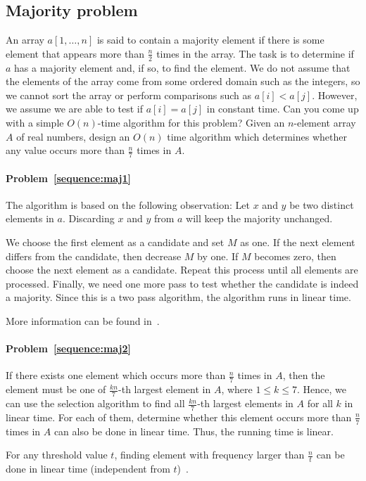 \subsection{Majority problem}
\begin{Exercise}
\Question An array $a[1, \dots, n]$ is said to contain a majority element if there is some element that appears more than $\frac{n}{2}$ times in the array. The task is to determine if $a$ has a majority element and, if so, to find the element. We do not assume that the elements of the array come from some ordered domain such as the integers, so we cannot sort the array or perform comparisons such as $a[i] < a[j]$. However, we assume we are able to test if $a[i] = a[j]$ in constant time. Can you come up with a simple $O(n)$-time algorithm for this problem? \label{sequence:maj1} 
\Question Given an $n$-element array $A$ of real numbers, design an $O(n)$ time algorithm which determines whether any value occurs more than $\frac{n}{7}$ times in $A$. \label{sequence:maj2}
\end{Exercise}

\begin{Answer}
\paragraph{Problem~\ref{sequence:maj1}}
The algorithm is based on the following observation: Let $x$ and $y$ be two distinct elements in $a$. Discarding $x$ and $y$ from $a$ will keep the majority unchanged. 

We choose the first element as a candidate and set $M$ as one. If the next element differs from the candidate, then decrease $M$ by one. If $M$ becomes zero, then choose the next element as a candidate. Repeat this process until all elements are processed. Finally, we need one more pass to test whether the candidate is indeed a majority. Since this is a two pass algorithm, the algorithm runs in linear time.

\begin{remark}
More information can be found in~\cite{Misra1982}.
\end{remark}

\paragraph{Problem~\ref{sequence:maj2}}
If there exists one element which occurs more than $\frac{n}{7}$ times in $A$, then the element must be one of $\frac{kn}{7}$-th largest element in $A$, where $1 \leq k \leq 7$. Hence, we can use the selection algorithm to find all $\frac{kn}{7}$-th largest elements in $A$ for all $k$ in linear time. For each of them, determine whether this element occurs more than $\frac{n}{7}$ times in $A$ can also be done in linear time. Thus, the running time is linear.

\begin{remark}
For any threshold value $t$, finding element with frequency larger than $\frac{n}{t}$ can be done in linear time (independent from $t$)~\cite{Karp2003}.
\end{remark}
\end{Answer}

